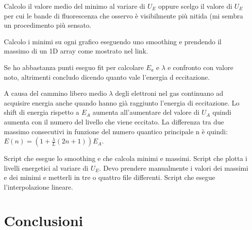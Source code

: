 \documentclass[10pt,a4paper]{article}
\begin{document}
Calcolo il valore medio del minimo al variare di $U_E$ oppure scelgo il valore di $U_E$ per cui le bande di fluorescenza che osservo è visibilmente più nitida (mi sembra un procedimento più sensato.

Calcolo i minimi su ogni grafico eseguendo uno smoothing e prendendo il massimo di un 1D array come mostrato nel link.

Se ho abbastanza punti eseguo fit per calcolare $E_a$ e $\lambda$ e confronto con valore noto, altrimenti concludo dicendo quanto vale l'energia d eccitazione. 

A causa del cammino libero medio $\lambda$ degli elettroni nel gas continuano ad acquisire energia anche quando hanno già raggiunto l'energia di eccitazione. Lo shift di energia rispetto a $E_A$ aumenta all'aumentare del valore di $U_A$ quindi aumenta con il numero del livello che viene eccitato. La differenza tra due massimo consecutivi in funzione del numero quantico principale n è quindi: $E(n) = ( 1 + \frac{\lambda}{L} ( 2 n + 1 ) ) E_A$. 

Script che esegue lo smoothing e che calcola minimi e massimi.
Script che plotta i livelli energetici al variare di $U_E$.
Devo prendere manualmente i valori dei massimi e dei minimi e metterli in tre o quattro file differenti.
Script che esegue l'interpolazione lineare.
 

\section{Conclusioni}
\end{document}
